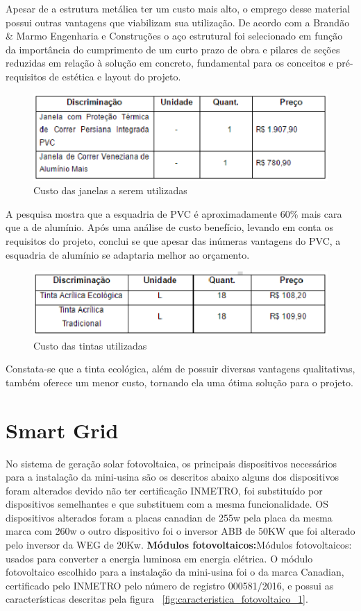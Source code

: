 Apesar de a estrutura metálica ter um custo mais alto, o emprego desse material possui outras vantagens que viabilizam sua utilização. De acordo com a Brandão \& Marmo Engenharia e Construções o aço estrutural foi selecionado em função da importância do cumprimento de um curto prazo de obra e pilares de seções reduzidas em relação à solução em concreto, fundamental para os conceitos e pré-requisitos de estética e layout do projeto.

\begin{figure}[!ht]
\centering
\includegraphics[keepaspectratio=true,scale=1]{figuras/precojanelas.eps}
\caption{Custo das janelas a serem utilizadas}
\end{figure}

A pesquisa mostra que a esquadria de PVC é aproximadamente 60\% mais cara que a de alumínio. Após uma análise de custo benefício, levando em conta os requisitos do projeto, conclui se que apesar das inúmeras vantagens do PVC, a esquadria de alumínio se adaptaria melhor ao orçamento.

\begin{figure}[!ht]
\centering
\includegraphics[scale=1]{figuras/custotintas.eps}
\caption{Custo das tintas utilizadas}
\end{figure}
\indent

Constata-se que a tinta ecológica, além de possuir diversas vantagens qualitativas, também oferece um menor custo, tornando ela uma ótima solução para o projeto.

\chapter[Smart Grid]{Smart Grid}
No sistema de geração solar fotovoltaica, os principais dispositivos necessários para a instalação da mini-usina são os descritos abaixo alguns dos dispositivos foram alterados devido não ter certificação INMETRO, foi substituído por dispositivos semelhantes e que substituem com a mesma funcionalidade. OS dispositivos alterados foram a placas canadian de 255w pela placa da mesma marca com 260w o outro dispositivo foi o inversor ABB de 50KW que foi alterado pelo inversor da WEG de 20Kw.
\textbf{Módulos fotovoltaicos:}Módulos fotovoltaicos: usados para converter a energia luminosa em energia elétrica. O módulo fotovoltaico escolhido para a instalação da mini-usina foi o da marca Canadian, certificado pelo INMETRO pelo número de registro 000581/2016, e possui as características descritas pela figura ~\ref{fig:caracteristica_fotovoltaico_1}.

